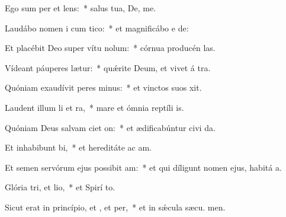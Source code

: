 \item Ego sum per et lens:~* salus tua, De,  me.
\item Laudábo nomen i cum tico:~* et magnificábo e  de:
\item Et placébit Deo super vítu nolum:~* córnua producén  las.
\item Vídeant páuperes  lætur:~* quǽrite Deum, et vivet á tra.
\item Quóniam exaudívit peres minus:~* et vinctos suos  xit.
\item Laudent illum li et ra,~* mare et ómnia reptíli  is.
\item Quóniam Deus salvam ciet on:~* et ædificabúntur civi da.
\item Et inhabibunt bi,~* et hereditáte ac am.
\item Et semen servórum ejus possibit am:~* et qui díligunt nomen ejus, habitá  a.
\item Glória tri, et lio,~* et Spirí to.
\item Sicut erat in princípio, et , et per,~* et in sǽcula sæcu. men.
